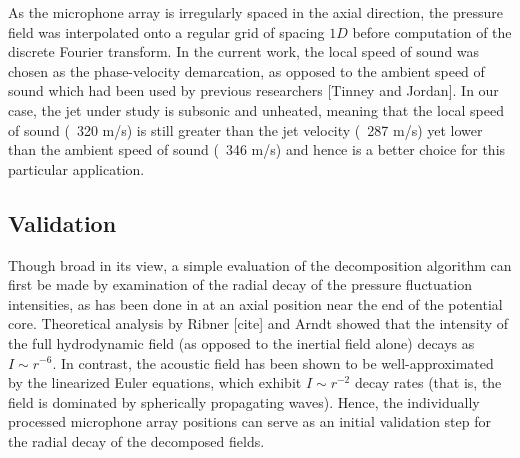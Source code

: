As the microphone array is irregularly spaced in the axial direction, the pressure field was interpolated onto a regular grid of spacing $1D$ before computation of the discrete Fourier transform. 
In the current work, the local speed of sound was chosen as the phase-velocity demarcation, as opposed to the ambient speed of sound which had been used by previous researchers [Tinney and Jordan]. 
In our case, the jet under study is subsonic and unheated, meaning that the local speed of sound (~320 m/s) is still greater than the jet velocity (~287 m/s) yet lower than the ambient speed of sound (~346 m/s) and hence is a better choice for this particular application.
\subsection{Validation}
Though broad in its view, a simple evaluation of the decomposition algorithm can first be made by examination of the radial decay of the pressure fluctuation intensities, as has been done in   at an axial position near the end of the potential core. 
Theoretical analysis by Ribner [cite] and Arndt \etal [cite] showed that the intensity of the full hydrodynamic field (as opposed to the inertial field alone) decays as $I \sim r^{-6}$. 
In contrast, the acoustic field has been shown to be well-approximated by the linearized Euler equations, which exhibit $I \sim r^{-2}$ decay rates (that is, the field is dominated by spherically propagating waves). 
Hence, the individually processed microphone array positions can serve as an initial validation step for the radial decay of the decomposed fields.

